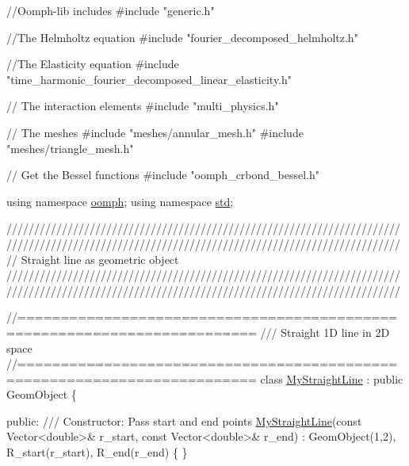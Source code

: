\begin{DoxyCodeInclude}
\textcolor{comment}{//Oomph-lib includes}
\textcolor{preprocessor}{#include "generic.h"}

\textcolor{comment}{//The Helmholtz equation}
\textcolor{preprocessor}{#include "fourier\_decomposed\_helmholtz.h"}

\textcolor{comment}{//The Elasticity equation}
\textcolor{preprocessor}{#include "time\_harmonic\_fourier\_decomposed\_linear\_elasticity.h"}

\textcolor{comment}{// The interaction elements}
\textcolor{preprocessor}{#include "multi\_physics.h"}

\textcolor{comment}{// The meshes}
\textcolor{preprocessor}{#include "meshes/annular\_mesh.h"}
\textcolor{preprocessor}{#include "meshes/triangle\_mesh.h"}

\textcolor{comment}{// Get the Bessel functions}
\textcolor{preprocessor}{#include "oomph\_crbond\_bessel.h"}

\textcolor{keyword}{using namespace }\hyperlink{namespaceoomph}{oomph};
\textcolor{keyword}{using namespace }\hyperlink{namespacestd}{std};

\textcolor{comment}{}
\textcolor{comment}{///////////////////////////////////////////////////////////////////////}
\textcolor{comment}{///////////////////////////////////////////////////////////////////////}
\textcolor{comment}{}\textcolor{comment}{// Straight line as geometric object}\textcolor{comment}{}
\textcolor{comment}{///////////////////////////////////////////////////////////////////////}
\textcolor{comment}{///////////////////////////////////////////////////////////////////////}
\textcolor{comment}{}


\textcolor{comment}{//=========================================================================}\textcolor{comment}{}
\textcolor{comment}{/// Straight 1D line in 2D space }
\textcolor{comment}{}\textcolor{comment}{//=========================================================================}
\textcolor{keyword}{class }\hyperlink{classMyStraightLine}{MyStraightLine} : \textcolor{keyword}{public} GeomObject
\{

\textcolor{keyword}{public}:
\textcolor{comment}{}
\textcolor{comment}{ /// Constructor:  Pass start and end points}
\textcolor{comment}{} \hyperlink{classMyStraightLine}{MyStraightLine}(\textcolor{keyword}{const} Vector<double>& r\_start, \textcolor{keyword}{const} Vector<double>& r\_end) 
  :  GeomObject(1,2), R\_start(r\_start), R\_end(r\_end)
  \{ \}


\end{DoxyCodeInclude}
